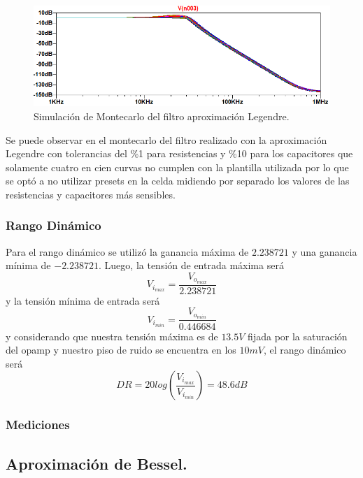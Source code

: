 \begin{figure}[H]
\centering
	\centering
	\includegraphics[width=\textwidth]{Imagenes-Ej1/legendre_mont.png}
	\caption{Simulación de Montecarlo del filtro aproximación Legendre.}
	\label{leg_mont_sim}
\end{figure}

Se puede observar en el montecarlo del filtro realizado con la aproximación Legendre con tolerancias del \%1  para resistencias y \%10 para los capacitores que solamente cuatro en cien curvas no cumplen con la plantilla utilizada por lo que se optó a no utilizar presets en la celda midiendo por separado los valores de las resistencias y capacitores más sensibles.

\subsubsection{Rango Dinámico}

Para el rango dinámico se utilizó la ganancia máxima de $2.238721$ y una ganancia mínima de $-2.238721$. Luego, la tensión de entrada máxima será
\begin{equation}
V_{i_{max}}= \frac{V_{o_{max}}}{2.238721}
\end{equation}
y la tensión mínima de entrada será
\begin{equation}
V_{i_{min}}= \frac{V_{o_{min}}}{0.446684}
\end{equation}
y considerando que nuestra tensión máxima es de $13.5V$ fijada por la saturación del opamp y nuestro piso de ruido se encuentra en los $10mV$, el rango dinámico será
\begin{equation}
DR=20log(\frac{V_{i_{max}}}{V_{i_{min}}}) = 48.6dB
\end{equation}


\subsubsection{Mediciones}



\subsection{Aproximación de Bessel.}

